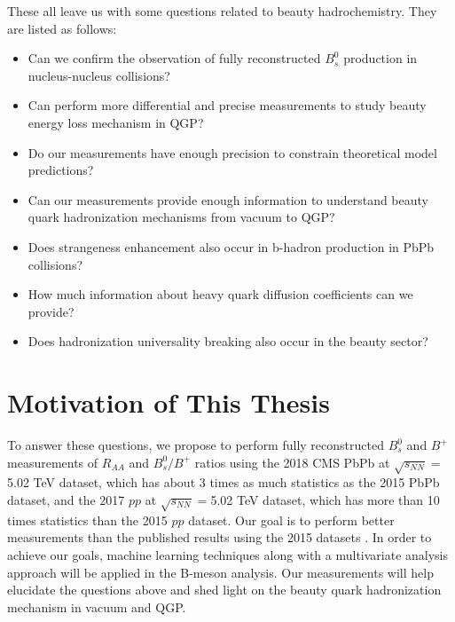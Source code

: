These all leave us with some questions related to beauty hadrochemistry. They are listed as follows:

\begin{itemize}
\item Can we confirm the observation of fully reconstructed $B^0_s$ production in nucleus-nucleus collisions?
\item Can perform more differential and precise measurements to study beauty energy loss mechanism in QGP?
\item Do our measurements have enough precision to constrain theoretical model predictions?
\item Can our measurements provide enough information to understand beauty quark hadronization mechanisms from vacuum to QGP?
\item Does strangeness enhancement also occur in b-hadron production in PbPb collisions?
\item How much information about heavy quark diffusion coefficients can we provide?
\item Does hadronization universality breaking also occur in the beauty sector?
\end{itemize}







\section{Motivation of This Thesis}

To answer these questions, we propose to perform fully reconstructed $B^0_s$ and $B^+$ measurements of $R_{AA}$ and $B^0_s/B^+$ ratios using the 2018 CMS PbPb at $\sqrt{s_{NN}} = $5.02 TeV dataset, which has about 3 times as much statistics as the 2015 PbPb dataset, and the 2017 $pp$ at $\sqrt{s_{NN}} = $5.02 TeV dataset, which has more than 10 times statistics than the 2015 $pp$ dataset. Our goal is to perform better measurements than the published results using the 2015 datasets \cite{CMSBsBP2015}. In order to achieve our goals, machine learning techniques along with a multivariate analysis approach will be applied in the B-meson analysis. Our measurements will help elucidate the questions above and shed light on the beauty quark hadronization mechanism in vacuum and QGP. 


